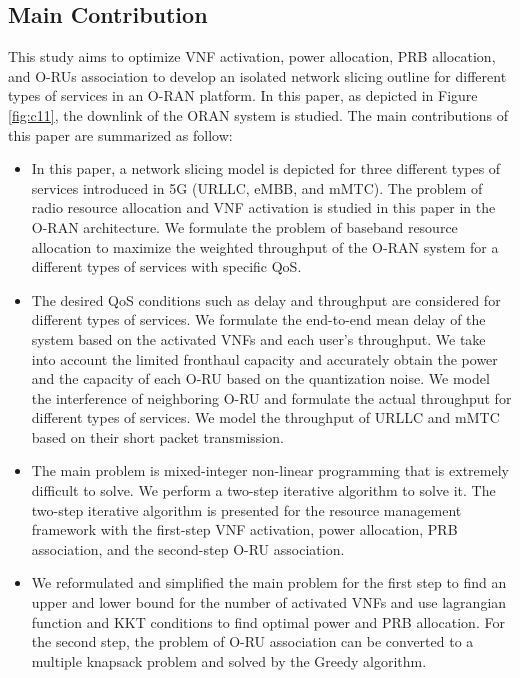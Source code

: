 \documentclass[conference]{IEEEtran}
\begin{document}
\subsection{Main Contribution}
This study aims to optimize VNF activation, power allocation, PRB allocation, and O-RUs association to develop an isolated network slicing outline for different types of services in an O-RAN platform. In this paper, as depicted in Figure \ref{fig:c11}, the downlink of the ORAN system is studied. The main contributions of this paper are summarized as follow:
\begin{itemize}
\item In this paper, a network slicing model is depicted for three different types of services introduced in 5G (URLLC, eMBB, and mMTC). The problem of radio resource allocation and VNF activation is studied in this paper in the O-RAN architecture.
We formulate the problem of baseband resource allocation to maximize the weighted throughput of the O-RAN system for a different types of services with specific QoS. 
\item The desired QoS conditions such as delay and throughput are considered for different types of services. We formulate the end-to-end mean delay of the system based on the activated VNFs and each user's throughput.
We take into account the limited fronthaul capacity and accurately obtain the power and the capacity of each O-RU based on the quantization noise.
We model the interference of neighboring O-RU and formulate the actual throughput
for different types of services. We model the throughput of URLLC and mMTC based on their short packet transmission.
\item The main problem is mixed-integer non-linear programming that is extremely difficult to solve.
We perform a two-step iterative algorithm to solve it.
The two-step iterative algorithm is presented for the resource management framework with the first-step VNF activation, power allocation, PRB association, and the second-step O-RU association.
\item We reformulated and simplified the main problem for the first step to find an upper and lower bound for the number of activated VNFs and use lagrangian function and KKT conditions to find optimal power and PRB allocation.
For the second step, the problem of O-RU association can be converted to a multiple knapsack problem and solved by the Greedy algorithm.
\end{itemize}  
\end{document}
